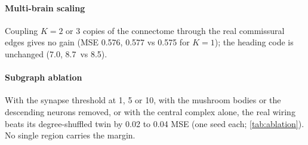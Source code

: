 \paragraph{Multi-brain scaling} Coupling $K=2$ or $3$ copies of the connectome through the real commissural edges gives
no gain (MSE 0.576, 0.577 vs 0.575 for $K=1$); the heading code is unchanged (7.0\degree, 8.7\degree\ vs 8.5\degree).

\paragraph{Subgraph ablation}
\label{sec:ablation}
With the synapse threshold at 1, 5 or 10, with the mushroom bodies or the descending neurons removed, or with the
central complex alone, the real wiring beats its degree-shuffled twin by 0.02 to 0.04 MSE (one seed each;
\cref{tab:ablation}). No single region carries the margin.
